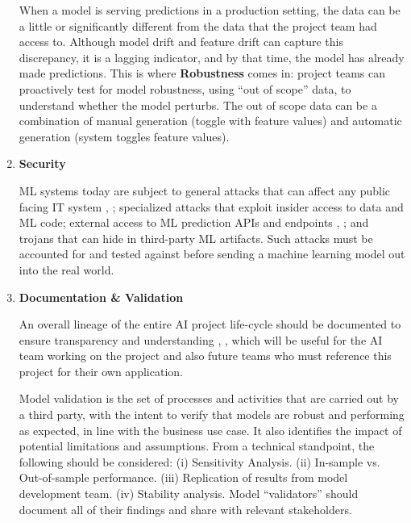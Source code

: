 \documentclass{article}
\begin{document}
\begin{enumerate}
    \smallskip When a model is serving predictions in a production setting, the data can be a little or significantly different from the data that the project team had access to. Although model drift and feature drift can capture this discrepancy, it is a lagging indicator, and by that time, the model has already made predictions. This is where \textbf{Robustness} comes in: project teams can proactively test for model robustness, using “out of scope” data, to understand whether the model perturbs. The out of scope data can be a combination of manual generation (toggle with feature values) and automatic generation (system toggles feature values).

    \item \textbf{Security}
   
    \smallskip ML systems today are subject to general attacks that can affect any public facing IT system \cite{security_of_ml}, \cite {papernot2018marauder}; specialized attacks that exploit insider access to data and ML code; external access to ML prediction APIs and endpoints \cite{model_stealing}, \cite{membership_inference}; and trojans that can hide in third-party ML artifacts. Such attacks must be accounted for and tested against before sending a machine learning model out into the real world.
    
    \item \textbf{Documentation \& Validation}
    
    \smallskip An overall lineage of the entire AI project life-cycle should be documented to ensure transparency and understanding \cite{Mitchell_2019}, \cite{data_cards}, which will be useful for the AI team working on the project and also future teams who must reference this project for their own application.

    \smallskip Model validation \cite{sr117, landry1983model} is the set of processes and activities that are carried out by a third party, with the intent to verify that models are robust and performing as expected, in line with the business use case. %
    It also identifies the impact of potential limitations and assumptions. From a technical standpoint, the following should be considered: (i) Sensitivity Analysis. (ii) In-sample vs. Out-of-sample performance. (iii) Replication of results from model development team. (iv) Stability analysis. Model ``validators'' should document all of their findings and share with relevant stakeholders.
    
\end{enumerate}
\end{document}
